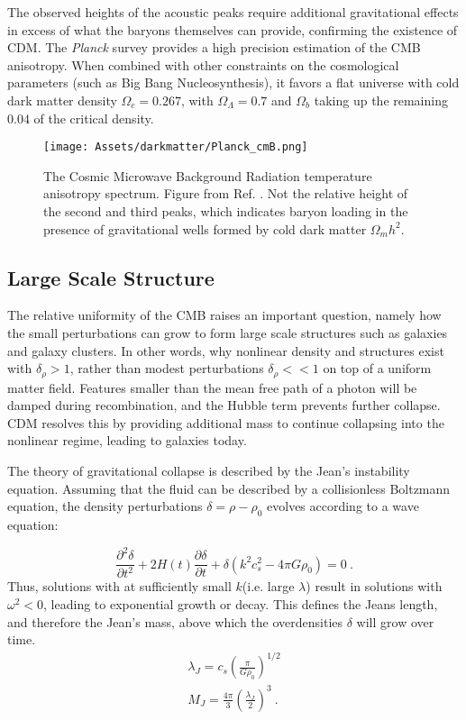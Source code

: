 The observed heights of the acoustic peaks require additional gravitational effects in excess of what the baryons themselves can provide, confirming the existence of CDM.
The \textit{Planck} survey\cite{planck_collaboration_planck_2020} provides a high precision estimation of the CMB anisotropy.
When combined with other constraints on the cosmological parameters (such as Big Bang Nucleosynthesis), it favors a flat universe with cold dark matter density $\Omega_c = 0.267$, with $\Omega_\Lambda=0.7$ and $\Omega_b$ taking up the remaining $0.04$ of the critical density.

\begin{figure}
    \centering
    \texttt{[image: Assets/darkmatter/Planck\_cmB.png]}
    \caption[The Cosmic Microwave Background Radiation temperature anisotropy spectrum.]%
    {The Cosmic Microwave Background Radiation temperature anisotropy spectrum.
    Figure from Ref. \cite{planck_collaboration_planck_2020}.
    Not the relative height of the second and third peaks, which indicates baryon loading in the presence of gravitational wells formed by cold dark matter $\Omega_m h^2$.}
    \label{fig:cmb}
\end{figure}

\subsection{Large Scale Structure}

The relative uniformity of the CMB raises an important question, namely how the small perturbations can grow to form large scale structures such as galaxies and galaxy clusters.
In other words, why nonlinear density and structures exist with $\delta_\rho >1$, rather than modest perturbations $\delta_\rho <<1$ on top of a uniform matter field.
Features smaller than the mean free path of a photon will be damped during recombination, and the Hubble term prevents further collapse.
CDM resolves this by providing additional mass to continue collapsing into the nonlinear regime, leading to galaxies today.

The theory of gravitational collapse is described by the Jean's instability equation.
Assuming that the fluid can be described by a collisionless Boltzmann equation, the density perturbations $\delta = \rho -\rho_0$ evolves according to a wave equation:

\begin{equation}
    \frac{\partial^2 \delta}{\partial t^2} + 2H(t) \frac{\partial \delta}{\partial t} + \delta (k^2 c_s^2 - 4 \pi G \rho_0 )=0~.
    \label{eq:jeans}
\end{equation}
\noindent
Thus, solutions with at sufficiently small $k$(i.e. large $\lambda$) result in  solutions with $\omega^2 <0$, leading to exponential growth or decay.
This defines the Jeans length, and therefore the Jean's mass, above which the overdensities $\delta$ will grow over time.
\begin{align}
    \lambda_J = c_s (\frac{\pi}{G \rho_0})^{1/2} \\
    M_J = \frac{4 \pi}{3} (\frac{\lambda_J}{2})^3~.
\end{align}


